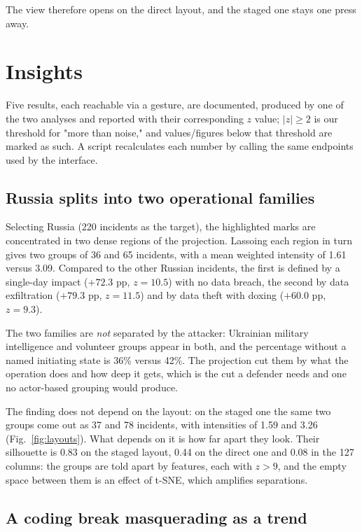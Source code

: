 \documentclass[conference]{IEEEtran}
\begin{document}
The view therefore opens on the direct layout, and the staged one stays one press away.

\section{Insights}\label{sec:insights}

Five results, each reachable via a gesture, are documented, produced by one of the two analyses and reported with their corresponding $z$ value; $|z|\geq 2$ is our threshold for "more than noise," and values/figures below that threshold are marked as such. A script recalculates each number by calling the same endpoints used by the interface.  

\subsection{Russia splits into two operational families}

Selecting Russia (220 incidents as the target), the highlighted marks are concentrated in two dense regions of the projection. Lassoing each region in turn gives two groups of 36 and 65 incidents, with a mean weighted intensity of 1.61 versus 3.09. Compared to the other Russian incidents, the first is defined by a single-day impact ($+72.3$ pp, $z=10.5$) with no data breach, the second by data exfiltration ($+79.3$ pp, $z=11.5$) and by data theft with doxing ($+60.0$ pp, $z=9.3$).

The two families are \emph{not} separated by the attacker: Ukrainian military intelligence and volunteer groups appear in both, and the percentage without a named initiating state is 36\% versus 42\%. The projection cut them by what the operation does and how deep it gets, which is the cut a defender needs and one no actor-based grouping would produce.

The finding does not depend on the layout: on the staged one the same two groups come out as 37 and 78 incidents, with intensities of 1.59 and 3.26 (Fig.~\ref{fig:layouts}). What depends on it is how far apart they look. Their silhouette is 0.83 on the staged layout, 0.44 on the direct one and 0.08 in the 127 columns: the groups are told apart by features, each with $z>9$, and the empty space between them is an effect of t-SNE, which amplifies separations.

\subsection{A coding break masquerading as a trend}
\end{document}
